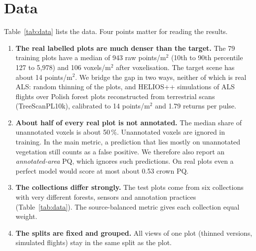 \documentclass[11pt,a4paper]{article}
\newcommand{\ppsm}{points/m$^2$}
\newcommand{\vpsm}{voxels/m$^2$}
\begin{document}
\section{Data}
\label{sec:data}

Table~\ref{tab:data} lists the data. Four points matter for reading the results.

\begin{enumerate}
  \item \textbf{The real labelled plots are much denser than the target.} The 79 training plots have a median of 943 raw \ppsm{} (10th to 90th percentile 127 to 5,978) and 106 \vpsm{} after voxelisation. The target scene has about 14 \ppsm. We bridge the gap in two ways, neither of which is real ALS: random thinning of the plots, and HELIOS++ \citep{winiwarter2022helios} simulations of ALS flights over Polish forest plots reconstructed from terrestrial scans (TreeScanPL10k), calibrated to 14 \ppsm{} and 1.79 returns per pulse.
  \item \textbf{About half of every real plot is not annotated.} The median share of unannotated voxels is about 50\,\%. Unannotated voxels are ignored in training. In the main metric, a prediction that lies mostly on unannotated vegetation still counts as a false positive. We therefore also report an \emph{annotated-area} PQ, which ignores such predictions. On real plots even a perfect model would score at most about 0.53 crown PQ.
  \item \textbf{The collections differ strongly.} The test plots come from six collections with very different forests, sensors and annotation practices (Table~\ref{tab:data}). The source-balanced metric gives each collection equal weight.
  \item \textbf{The splits are fixed and grouped.} All views of one plot (thinned versions, simulated flights) stay in the same split as the plot.
\end{enumerate}
\end{document}
